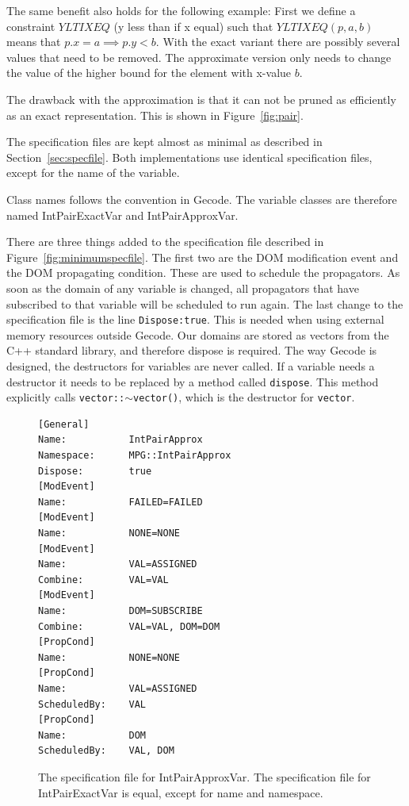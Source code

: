 \documentclass[a4paper,11pt]{article}
\begin{document}
The same benefit also holds for the following example: First we define a constraint $YLTIXEQ$ (y less than if x equal) such that $YLTIXEQ(p, a, b)$ means that $p.x=a\implies p.y<b$. With the exact variant there are possibly several values that need to be removed. The approximate version only needs to change the value of the higher bound for the element with x-value $b$.

The drawback with the approximation is that it can not be pruned as efficiently as an exact representation. This is shown in Figure~\ref{fig:pair}.



The specification files are kept almost as minimal as described in Section~\ref{sec:specfile}. Both implementations use identical specification files, except for the name of the variable. 

Class names follows the convention in Gecode. The variable classes are therefore named IntPairExactVar and IntPairApproxVar. 

There are three things added to the specification file described in Figure~\ref{fig:minimumspecfile}. The first two are the DOM modification event and the DOM propagating condition. These are used to schedule the propagators. As soon as the domain of any variable is changed, all propagators that have subscribed to that variable will be scheduled to run again. The last change to the specification file is the line \texttt{Dispose:true}. This is needed when using external memory resources outside Gecode. Our domains are stored as vectors from the C++ standard library, and therefore dispose is required. The way Gecode is designed, the destructors for variables are never called. If a variable needs a destructor it needs to be replaced by a method called \texttt{dispose}. This method explicitly calls \texttt{vector::$\sim$vector()}, which is the destructor for \texttt{vector}.

\begin{figure}[t]
\begin{minipage}{\linewidth}
\begin{lstlisting}[frame=single]
[General]
Name:           IntPairApprox
Namespace:      MPG::IntPairApprox
Dispose:        true
[ModEvent]
Name:           FAILED=FAILED
[ModEvent]
Name:           NONE=NONE
[ModEvent]
Name:           VAL=ASSIGNED
Combine:        VAL=VAL
[ModEvent]
Name:           DOM=SUBSCRIBE
Combine:        VAL=VAL, DOM=DOM
[PropCond]
Name:           NONE=NONE
[PropCond]
Name:           VAL=ASSIGNED
ScheduledBy:    VAL
[PropCond]
Name:           DOM
ScheduledBy:    VAL, DOM
\end{lstlisting}
\end{minipage}
\caption{The specification file for IntPairApproxVar. The specification file for IntPairExactVar is equal, except for name and namespace.}
\end{figure}
\end{document}
